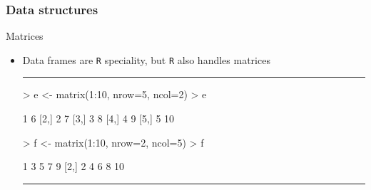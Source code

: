 \documentclass{beamer}
\begin{document}
\begin{frame}[fragile]
	\frametitle{Data structures}
	\centering \LARGE Matrices
	\begin{itemize}
		\small
	\item Data frames are \texttt{R} speciality, but \texttt{R} also handles matrices
\rule{\textwidth}{0.4pt}
\tiny
\begin{Schunk}
\begin{Sinput}
> e <- matrix(1:10, nrow=5, ncol=2)
> e
\end{Sinput}
\begin{Soutput}
     [,1] [,2]
[1,]    1    6
[2,]    2    7
[3,]    3    8
[4,]    4    9
[5,]    5   10
\end{Soutput}
\end{Schunk}
\vspace{20pt}
\begin{Schunk}
\begin{Sinput}
> f <-  matrix(1:10, nrow=2, ncol=5)
> f
\end{Sinput}
\begin{Soutput}
     [,1] [,2] [,3] [,4] [,5]
[1,]    1    3    5    7    9
[2,]    2    4    6    8   10
\end{Soutput}
\end{Schunk}
\rule{\textwidth}{0.4pt}\\
\small
	\end{itemize}
\end{frame}
\end{document}
